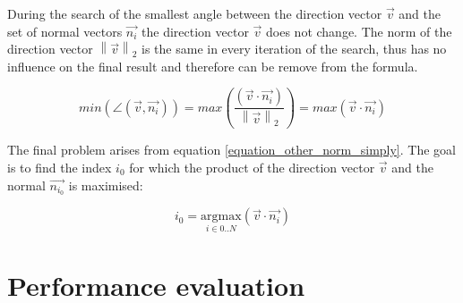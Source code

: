 During the search of the smallest angle between the direction vector $\overrightarrow{v}$ and the set of normal vectors $\overrightarrow{n_i}$ the direction vector $\overrightarrow{v}$ does not change. 
The norm of the direction vector $\left \| \overrightarrow{v} \right \|_2$ is the same in every iteration of the search, thus has no influence on the final result and therefore can be remove from the formula.

\begin{equation}
min \left (  \angle (\overrightarrow{v},\overrightarrow{n_i}) \right ) = 
max \left (    \frac{(\overrightarrow{v} \cdot \overrightarrow{n_i})}{\left \| \overrightarrow{v} \right \|_2  }  \right ) = max \left (    \overrightarrow{v} \cdot \overrightarrow{n_i}  \right ) 
\label{equation_other_norm_simply}
\end{equation}

The final problem arises from equation \ref{equation_other_norm_simply}. The goal is to find the index $i_0$ for which the product of the direction vector $\overrightarrow{v}$ and the normal $\overrightarrow{n_{i_0}}$ is maximised: 

\begin{equation}
i_0 = \underset{i \in 0..N}{\mathrm{argmax}} \left (    \overrightarrow{v} \cdot \overrightarrow{n_i}  \right )
\label{equation_arg_max}
\end{equation}


\section{Performance evaluation}